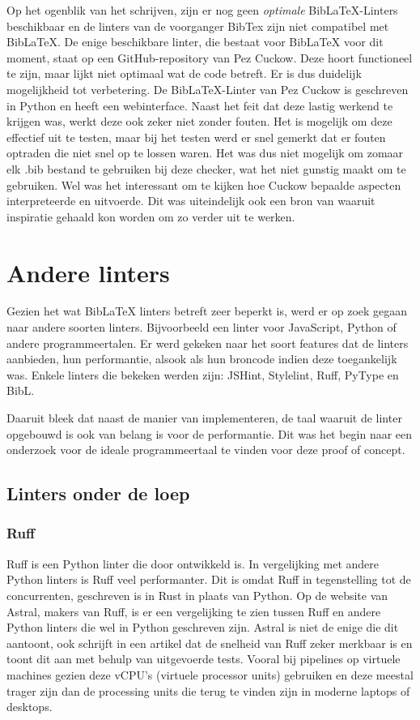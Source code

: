 Op het ogenblik van het schrijven, zijn er nog geen \emph{optimale} BibLaTeX-Linters beschikbaar en de linters van de voorganger BibTex zijn niet compatibel met BibLaTeX. De enige beschikbare linter, die bestaat voor BibLaTeX voor dit moment, staat op een GitHub-repository van Pez Cuckow. Deze hoort functioneel te zijn, maar lijkt niet optimaal wat de code betreft. Er is dus duidelijk mogelijkheid tot verbetering. De BibLaTeX-Linter van Pez Cuckow is geschreven in Python en heeft een webinterface.\autocite{Cuckow2022} Naast het feit dat deze lastig werkend te krijgen was, werkt deze ook zeker niet zonder fouten. Het is mogelijk om deze effectief uit te testen, maar bij het testen werd er snel gemerkt dat er fouten optraden die niet snel op te lossen waren. Het was dus niet mogelijk om zomaar elk .bib bestand te gebruiken bij deze checker, wat het niet gunstig maakt om te gebruiken. Wel was het interessant om te kijken hoe Cuckow bepaalde aspecten interpreteerde en uitvoerde. Dit was uiteindelijk ook een bron van waaruit inspiratie gehaald kon worden om zo verder uit te werken.


\section{Andere linters}
Gezien het wat BibLaTeX linters betreft zeer beperkt is, werd er op zoek gegaan naar andere soorten linters. Bijvoorbeeld een linter voor JavaScript, Python of andere programmeertalen. Er werd gekeken naar het soort features dat de linters aanbieden, hun performantie, alsook als hun broncode indien deze toegankelijk was. Enkele linters die bekeken werden zijn: JSHint, Stylelint, Ruff, PyType en BibL.

Daaruit bleek dat naast de manier van implementeren, de taal waaruit de linter opgebouwd is ook van belang is voor de performantie. Dit was het begin naar een onderzoek voor de ideale programmeertaal te vinden voor deze proof of concept. 

\subsection{Linters onder de loep}
\subsubsection{Ruff}
Ruff is een Python linter die door \textcite{Astral2024} ontwikkeld is. In vergelijking met andere Python linters is Ruff veel performanter. Dit is omdat Ruff in tegenstelling tot de concurrenten, geschreven is in Rust in plaats van Python. Op de website van Astral, makers van Ruff, is er een vergelijking te zien tussen Ruff en andere Python linters die wel in Python geschreven zijn. Astral is niet de enige die dit aantoont, ook \textcite{TurnerTrauring2023} schrijft in een artikel dat de snelheid van Ruff zeker merkbaar is en toont dit aan met behulp van uitgevoerde tests. Vooral bij pipelines op virtuele machines gezien deze vCPU's (virtuele processor units) gebruiken en deze meestal trager zijn dan de processing units die terug te vinden zijn in moderne laptops of desktops.

